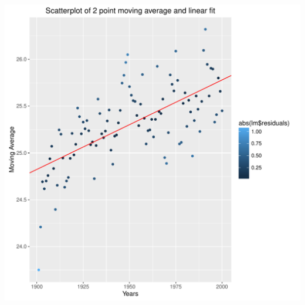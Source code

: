 \documentclass[a4paper]{article}
\begin{document}
\begin{minipage}{\linewidth}
\begin{center}
\includegraphics[width=.5\linewidth]{TAutocorrmovingavg.pdf}
\end{center}
\end{minipage}
\end{document}
